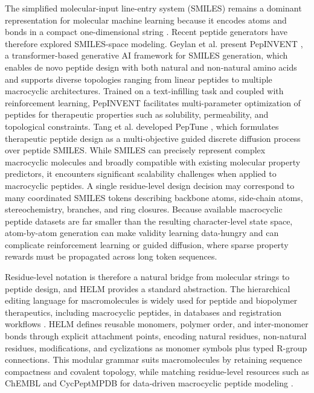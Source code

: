The simplified molecular-input line-entry system (SMILES) remains a dominant representation for molecular machine learning because it encodes atoms and bonds in a compact one-dimensional string \citep{ref_smiles}. Recent peptide generators have therefore explored SMILES-space modeling. Geylan et al. present PepINVENT \citep{geylan2025pepinvent}, a transformer-based generative AI framework for SMILES generation, which enables de novo peptide design with both natural and non-natural amino acids and supports diverse topologies ranging from linear peptides to multiple macrocyclic architectures. Trained on a text-infilling task and coupled with reinforcement learning, PepINVENT facilitates multi-parameter optimization of peptides for therapeutic properties such as solubility, permeability, and topological constraints. Tang et al. developed PepTune \citep{ref_peptune}, which formulates therapeutic peptide design as a multi-objective guided discrete diffusion process over peptide SMILES. While SMILES can precisely represent complex macrocyclic molecules and broadly compatible with existing molecular property predictors, it encounters significant scalability challenges when applied to macrocyclic peptides. A single residue-level design decision may correspond to many coordinated SMILES tokens describing backbone atoms, side-chain atoms, stereochemistry, branches, and ring closures. Because available macrocyclic peptide datasets are far smaller than the resulting character-level state space, atom-by-atom generation can make validity learning data-hungry and can complicate reinforcement learning or guided diffusion, where sparse property rewards must be propagated across long token sequences.

Residue-level notation is therefore a natural bridge from molecular strings to peptide design, and HELM provides a standard abstraction. The hierarchical editing language for macromolecules is widely used for peptide and biopolymer therapeutics, including macrocyclic peptides, in databases and registration workflows \citep{ref_helm,ref_chembl}. HELM defines reusable monomers, polymer order, and inter-monomer bonds through explicit attachment points, encoding natural residues, non-natural residues, modifications, and cyclizations as monomer symbols plus typed R-group connections. This modular grammar suits macromolecules by retaining sequence compactness and covalent topology, while matching residue-level resources such as ChEMBL and CycPeptMPDB for data-driven macrocyclic peptide modeling \citep{ref_chembl,ref_cycpeptmpdb}.

